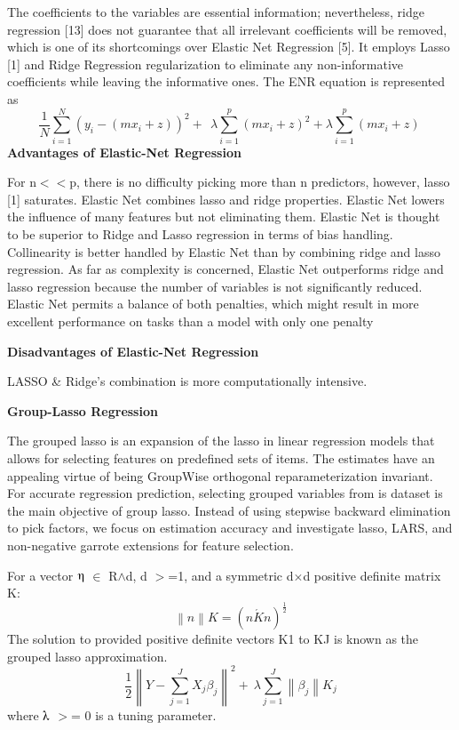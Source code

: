 \documentclass{article} %
\begin{document}
\noindent The coefficients to the variables are essential information; nevertheless, ridge regression [13] does not guarantee that all irrelevant coefficients will be removed, which is one of its shortcomings over Elastic Net Regression [5]. It employs Lasso [1] and Ridge Regression regularization to eliminate any non-informative coefficients while leaving the informative ones. The ENR equation is represented as 
\begin{equation} \label{GrindEQ__8_} 
\frac{1}{N}\sum^N_{i=1}{{\left(y_i-(mx_i+z)\right)}^2+\ }\ \lambda \sum^p_{i=1}{{\left(mx_i+z\right)}^2+\lambda \sum^p_{i=1}{\left(mx_i+z\right)}\ } 
\end{equation} 
\textbf{Advantages of Elastic-Net Regression}

\noindent For n$\mathrm{<}$$\mathrm{<}$p, there is no difficulty picking more than n predictors, however, lasso [1] saturates. Elastic Net combines lasso and ridge properties. Elastic Net lowers the influence of many features but not eliminating them. Elastic Net is thought to be superior to Ridge and Lasso regression in terms of bias handling. Collinearity is better handled by Elastic Net than by combining ridge and lasso regression. As far as complexity is concerned, Elastic Net outperforms ridge and lasso regression because the number of variables is not significantly reduced. Elastic Net permits a balance of both penalties, which might result in more excellent performance on tasks than a model with only one penalty

\noindent 

\noindent \textbf{Disadvantages of Elastic-Net Regression}

\noindent LASSO \& Ridge's combination is more computationally intensive.

\noindent 

\noindent \textbf{Group-Lasso Regression}

\noindent The grouped lasso is an expansion of the lasso in linear regression models that allows for selecting features on predefined sets of items. The estimates have an appealing virtue of being GroupWise orthogonal reparameterization invariant. For accurate regression prediction, selecting grouped variables from is dataset is the main objective of group lasso. Instead of using stepwise backward elimination to pick factors, we focus on estimation accuracy and investigate lasso, LARS, and non-negative garrote extensions for feature selection. 

\noindent For a vector $\etaup$ $\mathrm{\in }$ R$\mathrm{\wedge}$d, d $\mathrm{>}$=1, and a symmetric d$\mathrm{\times}$d positive definite matrix K: 
\[\left\|n\right\|K={\left(\acute{nKn}\right)}^{\frac{1}{2}}\] 
The solution to provided positive definite vectors K1 to KJ is known as the grouped lasso approximation. 
\begin{equation} \label{GrindEQ__9_} 
\frac{1}{2}{\left\|Y-\sum^J_{j=1}{X_j{\beta }_j}\right\|}^2+\ \lambda \sum^J_{j=1}{\left\|{\beta }_j\right\|}K_j 
\end{equation} 
where $\lambdaup$ $\mathrm{>}$= 0 is a tuning parameter.
\end{document}
